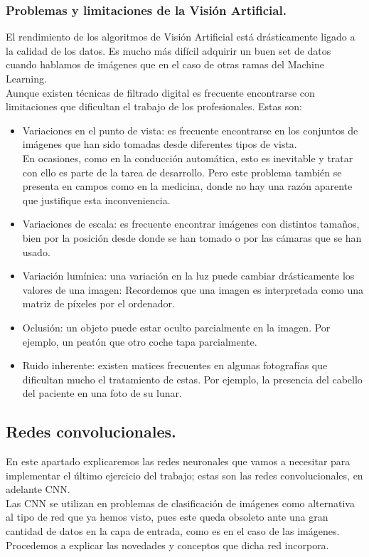 \documentclass[a4paper,10pt]{article}
\begin{document}
\subsubsection{Problemas y limitaciones de la Visión Artificial.}
El rendimiento de los algoritmos de Visión Artificial está drásticamente ligado a la calidad de los datos. Es mucho más difícil adquirir un buen set de datos cuando hablamos de imágenes que en el caso de otras ramas del Machine Learning.
\\Aunque existen técnicas de filtrado digital es frecuente encontrarse con limitaciones que dificultan el trabajo de los profesionales. Estas son:
\begin{itemize}
\item Variaciones en el punto de vista: es frecuente encontrarse en los conjuntos de imágenes que han sido tomadas desde diferentes tipos de vista. \\En ocasiones, como en la conducción automática, esto es inevitable y tratar con ello es parte de la tarea de desarrollo. Pero este problema también se presenta en campos como en la medicina, donde no hay una razón aparente que justifique esta inconveniencia. 
\item Variaciones de escala: es frecuente encontrar imágenes con distintos tamaños, bien por la posición desde donde se han tomado o por las cámaras que se han usado.
\item Variación lumínica: una variación en la luz puede cambiar drásticamente los valores de una imagen: Recordemos que una imagen es interpretada como una matriz de píxeles por el ordenador.
\item Oclusión:  un objeto puede estar oculto parcialmente en la imagen. Por ejemplo, un peatón que otro coche tapa parcialmente.
\item Ruido inherente: existen matices frecuentes en algunas fotografías que dificultan mucho el tratamiento de estas. Por ejemplo, la presencia del cabello del paciente en una foto de su lunar.

\end{itemize}



\newpage
\subsection{Redes convolucionales.}
En este apartado explicaremos las redes neuronales que vamos a necesitar para implementar el último ejercicio del trabajo; estas son las redes convolucionales, en adelante CNN. \\Las CNN se utilizan en problemas de clasificación de imágenes como alternativa al tipo de red que ya hemos visto, pues este queda obsoleto ante una gran cantidad de datos en la capa de entrada, como es en el caso de las imágenes.\\ Procedemos a explicar las novedades y conceptos que dicha red incorpora.\\
\end{document}
